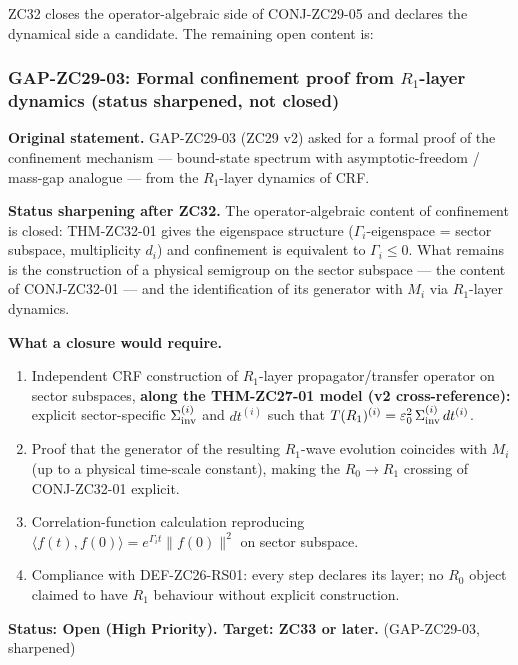 \documentclass[12pt, a4paper]{article}
\begin{document}
ZC32 closes the operator-algebraic side of CONJ-ZC29-05 and
declares the dynamical side a candidate. The remaining open
content is:

\subsubsection{GAP-ZC29-03: Formal confinement proof from
  $R_1$-layer dynamics (status sharpened, not closed)}

\begin{openqbox}[title={GAP-ZC29-03 (status sharpened):
  $R_1$-layer dynamical proof still open}]
\textbf{Original statement.}
GAP-ZC29-03 (ZC29 v2) asked for a formal proof of the
confinement mechanism --- bound-state spectrum with
asymptotic-freedom / mass-gap analogue --- from the
$R_1$-layer dynamics of CRF.

\textbf{Status sharpening after ZC32.}
The operator-algebraic content of confinement is closed:
THM-ZC32-01 gives the eigenspace structure
($\Gamma_i$-eigenspace = sector subspace, multiplicity $d_i$)
and confinement is equivalent to $\Gamma_i \leq 0$. What
remains is the construction of a physical semigroup on the
sector subspace --- the content of CONJ-ZC32-01 --- and the
identification of its generator with $M_i$ via
$R_1$-layer dynamics.

\textbf{What a closure would require.}
\begin{enumerate}[leftmargin=*, noitemsep]
  \item Independent CRF construction of $R_1$-layer
    propagator/transfer operator on sector subspaces,
    \textbf{along the THM-ZC27-01 model (v2 cross-reference):}
    explicit sector-specific $\Sigma_{\rm inv}^{(i)}$ and
    $dt^{(i)}$ such that $T(R_1)^{(i)} = \varepsilon_0^2\,
    \Sigma_{\rm inv}^{(i)}\,dt^{(i)}$.
  \item Proof that the generator of the resulting $R_1$-wave
    evolution coincides with $M_i$ (up to a physical
    time-scale constant), making the $R_0 \to R_1$ crossing
    of CONJ-ZC32-01 explicit.
  \item Correlation-function calculation reproducing
    $\langle f(t), f(0)\rangle = e^{\Gamma_i t}\|f(0)\|^2$
    on sector subspace.
  \item Compliance with DEF-ZC26-RS01: every step declares
    its layer; no $R_0$ object claimed to have $R_1$
    behaviour without explicit construction.
\end{enumerate}

\textbf{Status: Open (High Priority). Target: ZC33 or later.}
\hfill\textup{(GAP-ZC29-03, sharpened)}
\end{openqbox}
\end{document}
